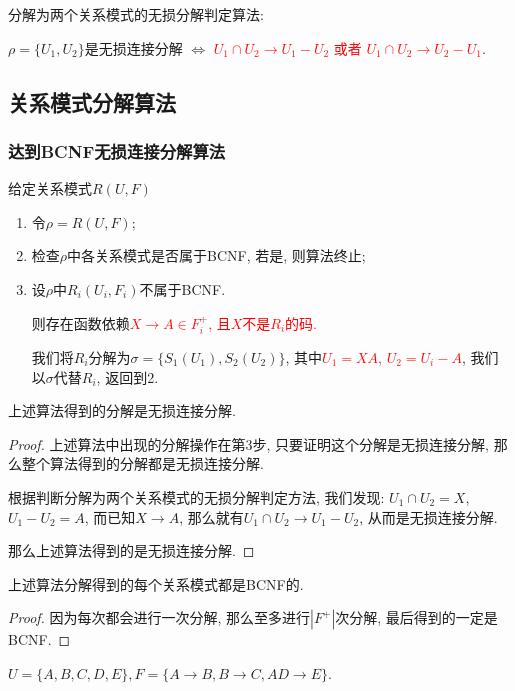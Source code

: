 分解为两个关系模式的无损分解判定算法:

$\rho=\{U_1,U_2\}$是无损连接分解 $\Leftrightarrow$ \textcolor{red}{$U_1\cap U_2\to U_1-U_2$ 或者 $U_1\cap U_2 \to U_2-U_1$}.


\subsection{关系模式分解算法}

\subsubsection{达到BCNF无损连接分解算法}

给定关系模式$R(U,F)$
\begin{enumerate}
    \item 令$\rho=R(U,F)$;
    \item 检查$\rho$中各关系模式是否属于BCNF, 若是, 则算法终止;
    \item 设$\rho$中$R_i(U_i,F_i)$不属于BCNF.

    则存在函数依赖\textcolor{red}{$X\to A\in F_i^+$, 且$X$不是$R_i$的码.}

    我们将$R_i$分解为$\sigma= \{S_1(U_1), S_2(U_2)\}$, 其中\textcolor{red}{$U_1=XA$, $U_2=U_i-A$}, 我们以$\sigma$代替$R_i$, 返回到2.
\end{enumerate}

\begin{theorem}
  上述算法得到的分解是无损连接分解.
\end{theorem}

\begin{proof}
  上述算法中出现的分解操作在第3步, 只要证明这个分解是无损连接分解, 那么整个算法得到的分解都是无损连接分解.

  根据判断分解为两个关系模式的无损分解判定方法, 我们发现: $U_1\cap U_2=X$, $U_1-U_2=A$, 而已知$X\to A$, 那么就有$U_1\cap U_2\to U_1-U_2$, 从而是无损连接分解.

  那么上述算法得到的是无损连接分解.
\end{proof}

\begin{theorem}
  上述算法分解得到的每个关系模式都是BCNF的.
\end{theorem}

\begin{proof}
  因为每次都会进行一次分解, 那么至多进行$|F^+|$次分解, 最后得到的一定是BCNF.
\end{proof}


\begin{example}
  $ U = \{A, B, C, D, E\}, F = \{A \rightarrow B, B \rightarrow C, AD \rightarrow E\}$.
\end{example}

